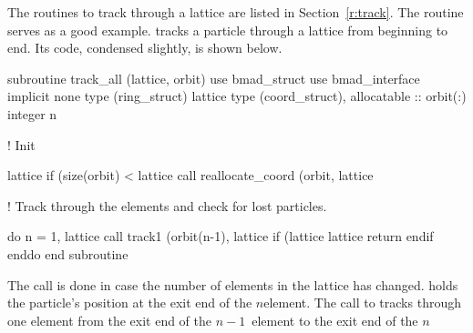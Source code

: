 The routines to track through a lattice are listed in
Section~\ref{r:track}. The  routine serves as a good
example.  tracks a particle through a lattice from
beginning to end. Its code, condensed slightly, is shown below.
\begin{example}
  subroutine track_all (lattice, orbit)
    use bmad_struct
    use bmad_interface
    implicit none
    type (ring_struct)  lattice
    type (coord_struct), allocatable :: orbit(:)
    integer n

  ! Init

    lattice%
    if (size(orbit) < lattice%
                    call reallocate_coord (orbit, lattice%

  ! Track through the elements and check for lost particles.

    do n = 1, lattice%
      call track1 (orbit(n-1), lattice%
      if (lattice%
        lattice%
        return
      endif
    enddo
  end subroutine
\end{example}
The  call is done in case the number of elements
in the lattice has changed.  holds the particle's
position at the exit end of the $n$\Th element. The call to
 tracks through one element from the exit end of the
$n-1$\St\ element to the exit end of the $n$\Th
